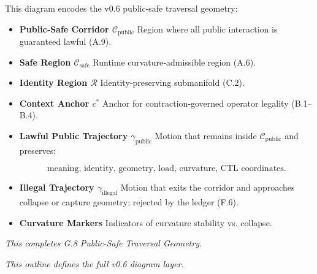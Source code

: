 \medskip

\noindent
This diagram encodes the v0.6 public‑safe traversal geometry:

\begin{itemize}
    \item \textbf{Public‑Safe Corridor $\mathcal{C}_{\mathrm{public}}$}  
    Region where all public interaction is guaranteed lawful (A.9).

    \item \textbf{Safe Region $\mathcal{C}_{\mathrm{safe}}$}  
    Runtime curvature‑admissible region (A.6).

    \item \textbf{Identity Region $\mathcal{R}$}  
    Identity‑preserving submanifold (C.2).

    \item \textbf{Context Anchor $c^*$}  
    Anchor for contraction‑governed operator legality (B.1–B.4).

    \item \textbf{Lawful Public Trajectory $\gamma_{\mathrm{public}}$}  
    Motion that remains inside $\mathcal{C}_{\mathrm{public}}$ and preserves:
    

\[
    \text{meaning, identity, geometry, load, curvature, CTL coordinates.}
    \]



    \item \textbf{Illegal Trajectory $\gamma_{\mathrm{illegal}}$}  
    Motion that exits the corridor and approaches collapse or capture geometry;
    rejected by the ledger (F.6).

    \item \textbf{Curvature Markers}  
    Indicators of curvature stability vs. collapse.
\end{itemize}

\medskip

\noindent
\textit{This completes G.8 Public-Safe Traversal Geometry.}


\medskip
\noindent\textit{This outline defines the full v0.6 diagram layer.}
